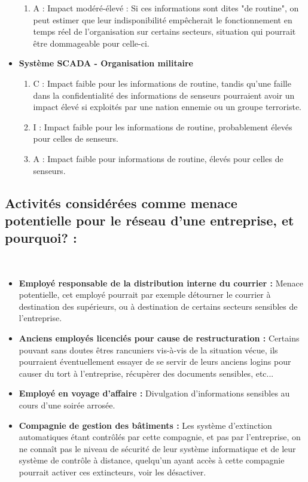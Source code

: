 \documentclass{report}
\begin{document}
\begin{itemize}
\begin{enumerate}
						\item A : Impact modéré-élevé : Si ces informations sont dites "de routine", on peut estimer que leur indisponibilité empêcherait le fonctionnement en temps réel de l'organisation sur certains secteurs, situation qui pourrait être dommageable pour celle-ci.\\
					\end{enumerate}
				\item \textbf{Système SCADA - Organisation militaire}
					\begin{enumerate}
						\item C : Impact faible pour les informations de routine, tandis qu'une faille dans la confidentialité des informations de senseurs pourraient avoir un impact élevé si exploités par une nation ennemie ou un groupe terroriste.\\
						\item I : Impact faible pour les informations de routine, probablement élevés pour celles de senseurs.\\
						\item A : Impact faible pour informations de routine, élevés pour celles de senseurs.\\
					\end{enumerate}
			\end{itemize}

		\subsection{Activités considérées comme menace potentielle pour le réseau d'une entreprise, et pourquoi? : }\\
			\begin{itemize}
				\item \textbf{Employé responsable de la distribution interne du courrier : } Menace potentielle, cet employé pourrait par exemple détourner le courrier à destination des supérieurs, ou à destination de certains secteurs sensibles de l'entreprise.\\
				\item \textbf{Anciens employés licenciés pour cause de restructuration : } Certains pouvant sans doutes êtres rancuniers vis-à-vis de la situation vécue, ils pourraient éventuellement essayer de se servir de leurs anciens logins pour causer du tort à l'entreprise, récupèrer des documents sensibles, etc...
				\item \textbf{Employé en voyage d'affaire : } Divulgation d'informations sensibles au cours d'une soirée arrosée.\\
				\item \textbf{Compagnie de gestion des bâtiments : } Les système d'extinction automatiques étant contrôlés par cette compagnie, et pas par l'entreprise, on ne connaît pas le niveau de sécurité de leur système informatique et de leur système de contrôle à distance, quelqu'un ayant accès à cette compagnie pourrait activer ces extincteurs, voir les désactiver.\\
			\end{itemize}
\end{document}
